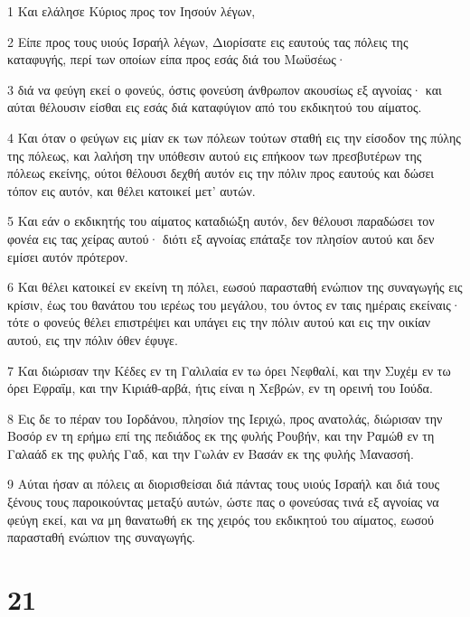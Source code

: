 \par 1 Και ελάλησε Κύριος προς τον Ιησούν λέγων,
\par 2 Είπε προς τους υιούς Ισραήλ λέγων, Διορίσατε εις εαυτούς τας πόλεις της καταφυγής, περί των οποίων είπα προς εσάς διά του Μωϋσέως·
\par 3 διά να φεύγη εκεί ο φονεύς, όστις φονεύση άνθρωπον ακουσίως εξ αγνοίας· και αύται θέλουσιν είσθαι εις εσάς διά καταφύγιον από του εκδικητού του αίματος.
\par 4 Και όταν ο φεύγων εις μίαν εκ των πόλεων τούτων σταθή εις την είσοδον της πύλης της πόλεως, και λαλήση την υπόθεσιν αυτού εις επήκοον των πρεσβυτέρων της πόλεως εκείνης, ούτοι θέλουσι δεχθή αυτόν εις την πόλιν προς εαυτούς και δώσει τόπον εις αυτόν, και θέλει κατοικεί μετ' αυτών.
\par 5 Και εάν ο εκδικητής του αίματος καταδιώξη αυτόν, δεν θέλουσι παραδώσει τον φονέα εις τας χείρας αυτού· διότι εξ αγνοίας επάταξε τον πλησίον αυτού και δεν εμίσει αυτόν πρότερον.
\par 6 Και θέλει κατοικεί εν εκείνη τη πόλει, εωσού παρασταθή ενώπιον της συναγωγής εις κρίσιν, έως του θανάτου του ιερέως του μεγάλου, του όντος εν ταις ημέραις εκείναις· τότε ο φονεύς θέλει επιστρέψει και υπάγει εις την πόλιν αυτού και εις την οικίαν αυτού, εις την πόλιν όθεν έφυγε.
\par 7 Και διώρισαν την Κέδες εν τη Γαλιλαία εν τω όρει Νεφθαλί, και την Συχέμ εν τω όρει Εφραΐμ, και την Κιριάθ-αρβά, ήτις είναι η Χεβρών, εν τη ορεινή του Ιούδα.
\par 8 Εις δε το πέραν του Ιορδάνου, πλησίον της Ιεριχώ, προς ανατολάς, διώρισαν την Βοσόρ εν τη ερήμω επί της πεδιάδος εκ της φυλής Ρουβήν, και την Ραμώθ εν τη Γαλαάδ εκ της φυλής Γαδ, και την Γωλάν εν Βασάν εκ της φυλής Μανασσή.
\par 9 Αύται ήσαν αι πόλεις αι διορισθείσαι διά πάντας τους υιούς Ισραήλ και διά τους ξένους τους παροικούντας μεταξύ αυτών, ώστε πας ο φονεύσας τινά εξ αγνοίας να φεύγη εκεί, και να μη θανατωθή εκ της χειρός του εκδικητού του αίματος, εωσού παρασταθή ενώπιον της συναγωγής.

\chapter{21}

